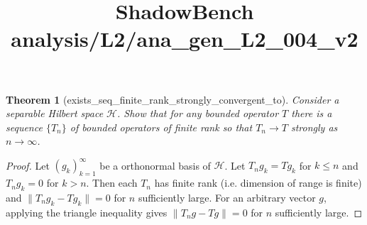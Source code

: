 \documentclass{article}
\title{ShadowBench analysis/L2/ana\_gen\_L2\_004\_v2}
\newtheorem{theorem}{Theorem}
\begin{document}
\maketitle

\begin{theorem}[exists_seq_finite_rank_strongly_convergent_to]
Consider a separable Hilbert space $\mathcal{H}$.
Show that for any bounded operator $T$ there is a sequence $\{T_n\}$ of bounded operators of finite rank so that $T_n \to T$ strongly as $n \to \infty$.
\end{theorem}

\begin{proof}
Let $(g_k)_{k=1}^{\infty}$ be a orthonormal basis of $\mathcal{H}$. Let $T_n g_k = T g_k$ for $k \le n$ and $T_n g_k = 0$ for $k > n$. Then each $T_n$ has finite rank (i.e. dimension of range is finite) and $\|T_n g_k - T g_k\| = 0$ for $n$ sufficiently large. For an arbitrary vector $g$, applying the triangle inequality gives $\|T_n g - T g\| = 0$ for $n$ sufficiently large.
\end{proof}
\end{document}
